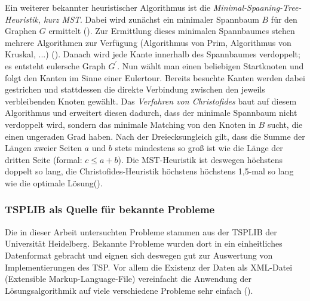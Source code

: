 \documentclass[doktyp=barbeit, sprache=german]{TUBAFarbeiten}
\begin{document}
Ein weiterer bekannter heuristischer Algorithmus ist die \textit{Minimal-Spaaning-Tree-Heuristik, kurz MST}. Dabei wird zunächst ein minimaler Spannbaum $B$ für den Graphen $G$ ermittelt (\cite{Groetschel2005}). Zur Ermittlung dieses minimalen Spannbaumes stehen mehrere Algorithmen zur Verfügung (Algorithmus von Prim, Algorithmus von Kruskal, ...) (\cite{MST}). Danach wird jede Kante innerhalb des Spannbaumes verdoppelt; es entsteht eulersche Graph $G^\prime$. Nun wählt man einen beliebigen Startknoten und folgt den Kanten im Sinne einer Eulertour. Bereits besuchte Kanten werden dabei gestrichen und stattdessen die direkte Verbindung zwischen den jeweils verbleibenden Knoten gewählt. Das \textit{Verfahren von Christofides} baut auf diesem Algorithmus und erweitert diesen dadurch, dass der minimale Spannbaum nicht verdoppelt wird, sondern das minimale Matching von den Knoten in $B$ sucht, die einen ungeraden Grad haben. Nach der Dreiecksungleich gilt, dass die Summe der Längen zweier Seiten $a$ und $b$ stets mindestens so groß ist wie die Länge der dritten Seite (formal: $c \leq a + b$). Die MST-Heuristik ist deswegen höchstens doppelt so lang, die Christofides-Heuristik höchstens höchstens 1,5-mal so lang wie die optimale Lösung(\cite{Groetschel2005}).
\subsubsection{TSPLIB als Quelle für bekannte Probleme} \label{TSPLIB}
Die in dieser Arbeit untersuchten Probleme stammen aus der TSPLIB der Universität Heidelberg. Bekannte Probleme wurden dort in ein einheitliches Datenformat gebracht und eignen sich deswegen gut zur Auswertung von Implementierungen des TSP. Vor allem die Existenz der Daten als XML-Datei (Extensible Markup-Language-File) vereinfacht die Anwendung der Lösungsalgorithmik auf viele verschiedene Probleme sehr einfach (\cite{TSPLIB}).
\end{document}
